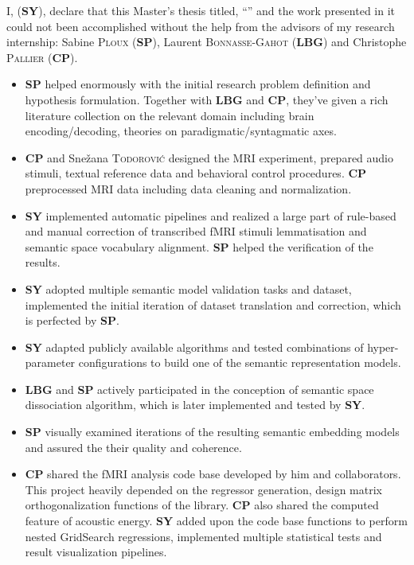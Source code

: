 \begin{declarationcontribution}
    \addchaptertocentry{\contributionname} %
    \noindent I, \authorname (\textbf{SY}), declare that this Master's thesis titled, \enquote{\ttitle} and the work presented in it could not been accomplished without the help from the advisors of my research internship: Sabine \textsc{Ploux} (\textbf{SP}), Laurent \textsc{Bonnasse-Gahot} (\textbf{LBG}) and Christophe \textsc{Pallier} (\textbf{CP}).
    
    \begin{itemize} 
    \item \textbf{SP} helped enormously with the initial research problem definition and hypothesis formulation. Together with \textbf{LBG} and \textbf{CP}, they've given a rich literature collection on the relevant domain including brain encoding/decoding, theories on paradigmatic/syntagmatic axes.
    \item \textbf{CP} and Snežana \textsc{Todorović} designed the MRI experiment, prepared audio stimuli, textual reference data and behavioral control procedures. \textbf{CP} preprocessed MRI data including data cleaning and normalization. 
    \item \textbf{SY} implemented automatic pipelines and realized a large part of rule-based and manual correction of transcribed fMRI stimuli lemmatisation and semantic space vocabulary alignment. \textbf{SP} helped the verification of the results.
    \item \textbf{SY} adopted multiple semantic model validation tasks and dataset, implemented the initial iteration of dataset translation and correction, which is perfected by \textbf{SP}.
    \item \textbf{SY} adapted publicly available algorithms and tested combinations of hyper-parameter configurations to build one of the semantic representation models.
    \item \textbf{LBG} and \textbf{SP} actively participated in the conception of semantic space dissociation algorithm, which is later implemented and tested by \textbf{SY}. 
    \item \textbf{SP} visually examined iterations of the resulting semantic embedding models and assured the their quality and coherence.
    \item \textbf{CP} shared the fMRI analysis code base developed by him and collaborators. This project heavily depended on the regressor generation, design matrix orthogonalization functions of the library. \textbf{CP} also shared the computed feature of acoustic energy. \textbf{SY} added upon the code base functions to perform nested GridSearch regressions, implemented multiple statistical tests and result visualization pipelines.

\end{itemize}
\end{declarationcontribution}
